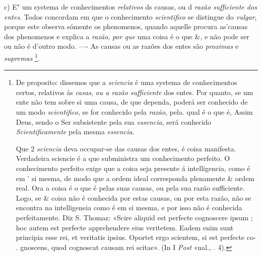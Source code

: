 c) E" um systema de conhecimentos \emph{relativos} ds causas, ou d \emph{razão sufficiente dos entes}. Todos concordam em que o conhecimento \emph{scientifico} se distingue do \emph{vulgar}, porque este observa sómente os phenomenos, quando aquelle procura as'causas dos   phenomenos e explica a \emph{razão}, \emph{por que} uma coisa é o que \&, e não pode ser ou não é d'outro modo. ---- As causas ou as razões dos entes são \emph{proximas} e \emph{supremas} \footnote{De proposito: dissemos que a \emph{sciencia} é uma systema de conhecimentos certos, relativos ás \emph{casas}, \emph{ou a razão sufficiente} dos entes. Por quanto, se um ente não tem sobre si uma causa, de que dependa, poderá ser conhecido de um modo \emph{scientifico}, se for conhecido pela \emph{razão}, pela. qual é o que é, Assim Deus, sendo o Ser subsistente pela sua \emph{essencia}, será conhecido \emph{Scientificamente} pela mesma \emph{essencia}.\par Que 2 \emph{sciencia} deva occupar-se das causas dos entes, é coisa manifesta. Verdadeira sciencie é a que subministra um conhecimento perfeito. O conhecimento perfeito exige que a coisa seja presente á intelligencia, como é em ' si mesma, de modo que a ordem ideal corresponda plenamente \& ordem real. Ora a coisa é o que é pelas suas causas, ou pela sua razão sufficiente. Logo, se \& coisa não é conhecida por estas causas, on por esta razão, não se encontra na intelligeneia como é em si mesma, e por isso não é conhecida perfeitamente. Diz S. Thomaz: «Scire aliquid est perfecte cognoscere ipsum ; hoc autem est perfecte apprehendere eius veritetem. Eadem enim sunt principia esse rei, et veritatis ipsius. Oportet ergo scientem, si est perfecte co- . gnoscens, quod cognoscat causam rei scitae». (In I \emph{Post} «nal., \textbar{}. 4).}.

